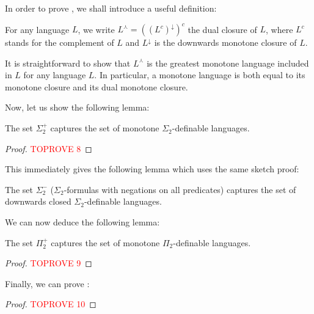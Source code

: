 \documentclass[a4paper,UKenglish,cleveref, autoref, thm-restate]{lipics-v2021}
\newcommand{\dualmon}{\curlywedge}
\begin{document}
In order to prove , we shall introduce a useful definition:

\begin{definition}
    For any language $L$, we write $L^{\dualmon} = ((L^c)^\downarrow)^c$ the dual closure of $L$, where $L^c$ stands for the complement of $L$ and $L^\downarrow$ is the downwards monotone closure of $L$.
\end{definition}

\begin{remark}\label{rmk:monclos}
    It is straightforward to show that $L^{\dualmon}$ is the greatest monotone language included in $L$ for any language $L$.
    In particular, a monotone language is both equal to its monotone closure and its dual monotone closure.
\end{remark}


Now, let us show the following lemma:

\begin{lemma}\label{lem:sig2+}
    The set $\Sigma_2^+$ captures the set of monotone $\Sigma_2$-definable languages.
\end{lemma}

\begin{proof}\textcolor{red}{TOPROVE 8}\end{proof}


This immediately gives the following lemma which uses the same sketch proof:

\begin{lemma}\label{lem:sig2-}
    The set $\Sigma_2^-$ ($\Sigma_2$-formulas with negations on all predicates) captures the set of downwards closed $\Sigma_2$-definable languages.
\end{lemma}



We can now deduce the following lemma:

\begin{lemma}\label{pi2+}
    The set $\Pi_2^+$ captures the set of monotone $\Pi_2$-definable languages.
\end{lemma}


\begin{proof}\textcolor{red}{TOPROVE 9}\end{proof}








Finally, we can prove :

\begin{proof}\textcolor{red}{TOPROVE 10}\end{proof}
\end{document}
